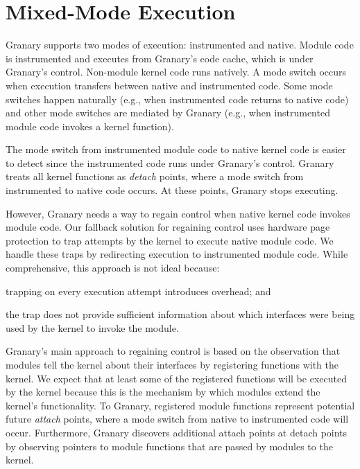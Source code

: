 \documentclass[preprint]{sigplanconf}
\begin{document}
\section{Mixed-Mode Execution}\label{sec:modes}
Granary supports two modes of execution: instrumented and native. Module code is instrumented and executes from Granary's code cache, which is under Granary's control. Non-module kernel code runs natively. A mode switch occurs when execution transfers between native and instrumented code. Some mode switches happen naturally (e.g., when instrumented code returns to native code) and other mode switches are mediated by Granary (e.g., when instrumented module code invokes a kernel function).

The mode switch from instrumented module code to native kernel code is easier to detect since the instrumented code runs under Granary's control. Granary treats all kernel functions as \emph{detach} points, where a mode switch from instrumented to native code occurs. At these points, Granary stops executing.

However, Granary needs a way to regain control when native kernel code invokes module code. Our fallback solution for regaining control uses hardware page protection to trap attempts by the kernel to execute native module code. We handle these traps by redirecting execution to instrumented module code. While comprehensive, this approach is not ideal because: \begin{inparaenum}[i)]
	\item trapping on every execution attempt introduces overhead; and
	\item the trap does not provide sufficient information about which interfaces were being used by the kernel to invoke the module.
\end{inparaenum}

Granary's main approach to regaining control is based on the observation that modules tell the kernel about their interfaces by registering functions with the kernel. We expect that at least some of the registered functions will be executed by the kernel because this is the mechanism by which modules extend the kernel's functionality. To Granary, registered module functions represent potential future \emph{attach} points, where a mode switch from native to instrumented code will occur. Furthermore, Granary discovers additional attach points at detach points by observing pointers to module functions that are passed by modules to the kernel.
\end{document}

